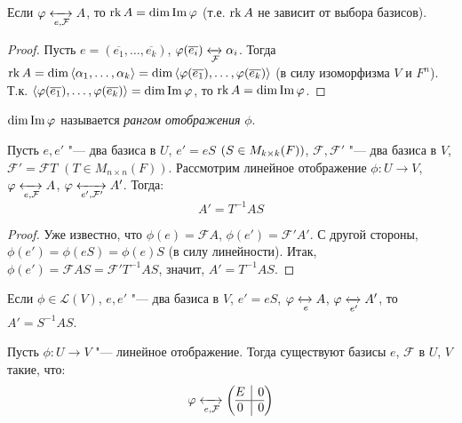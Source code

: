 \begin{proposition}
	Если $\phi \xleftrightarrow[e, \mathcal{F}]{} A$, то $\rk{A} = \dim{\im{\phi}}$ (т.\:е. $\rk{A}$ не зависит от выбора базисов).
\end{proposition}

\begin{proof}
	Пусть $e = (\overline{e_1}, \dots, \overline{e_k})$, $\phi(\overline{e_i}) \xleftrightarrow[\mathcal{F}]{} \alpha_i$. Тогда $\rk{A} \hm{=} \dim{\langle \alpha_1, \dots, \alpha_k\rangle} = \dim{\langle \phi(\overline{e_1}), \dots, \phi(\overline{e_k})\rangle}$ (в силу изоморфизма $V$ и $F^n$). Т.\:к. $\langle \phi(\overline{e_1}), \dots, \phi(\overline{e_k})\rangle = \dim{\im{\phi}}$, то $\rk{A} = \dim{\im{\phi}}$.
\end{proof}

\begin{definition}
	$\dim{\im{\phi}}$ называется \textit{рангом отображения} $\phi$.
\end{definition}

\begin{proposition}
	Пусть $e, e'$ "--- два базиса в $U$, $e' = eS$ $(S \hm{\in} M_{k \times k}(F))$, $\mathcal{F}, \mathcal{F}'$ "--- два базиса в $V$, $\mathcal{F}' = \mathcal{F}T$ $(T \in M_{n \times n}(F))$. Рассмотрим линейное отображение $\phi: U \rightarrow V$, $\phi \xleftrightarrow[e, \mathcal{F}]{} A$, $\phi \xleftrightarrow[e', \mathcal{F}']{} A'$. Тогда:
	\[A' = T^{-1}AS\]
\end{proposition}

\begin{proof}
	Уже известно, что $\phi(e) = \mathcal{F}A$, $\phi(e') = \mathcal{F}'A'$. С другой стороны, $\phi(e') = \phi(eS) = \phi(e)S$ (в силу линейности). Итак, $\phi({e'}) = \mathcal{F}AS = \mathcal{F'}T^{-1}AS$, значит, $A' = T^{-1}AS$.
\end{proof}

\begin{corollary}
	Если $\phi \in \mathcal{L}(V)$, $e, e'$ "--- два базиса в $V$, $e' = eS$, $\phi \xleftrightarrow[e]{} A$, $\phi \xleftrightarrow[e']{} A'$, то $A' = S^{-1}AS$.
\end{corollary}

\begin{theorem}
	Пусть $\phi: U \rightarrow V$ "--- линейное отображение. Тогда существуют базисы $e$, $\mathcal{F}$ в $U$, $V$ такие, что:
	\[\phi \xleftrightarrow[e, \mathcal{F}]{} \left(\begin{array}{@{}c|c@{}}
	E & 0\\
	\hline
	0 & 0
	\end{array}\right)\]
\end{theorem}

